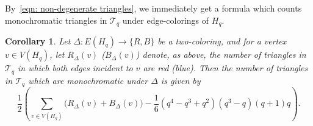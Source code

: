 \documentclass[A4paper,reqno,oneside,12pt]{amsart}
\theoremstyle{plain}
\newtheorem{corollary}[theorem]{Corollary}
\theoremstyle{definition}
\newcommand{\scT}{\mathscr{T}}
\begin{document}
By~\eqref{eqn: non-degenerate triangles}, we immediately get a formula which counts monochromatic triangles in $\scT_q$ under edge-colorings of $H_q$.

\begin{corollary}
\label{cor: goodman}
    Let $\Delta: E(H_q) \to \{R,B\}$ be a two-coloring, and for a vertex $v \in V(H_q)$, let $R_\Delta(v)$ ($B_\Delta(v)$) denote, as above, the number of triangles in $\scT_q$ in which both edges incident to $v$ are red (blue).
    Then the number of triangles in $\scT_q$ which are monochromatic under $\Delta$ is given by
    \begin{equation}
    \label{eq: Goodman-Hq}
        \frac{1}{2} \left( \sum_{v \in V(H_q)} {\Big (} R_\Delta(v) + B_\Delta(v) {\Big )} - \frac{1}{6} (q^4-q^3+q^2)(q^3-q)(q+1)q \right).
    \end{equation}
\end{corollary}
\end{document}
